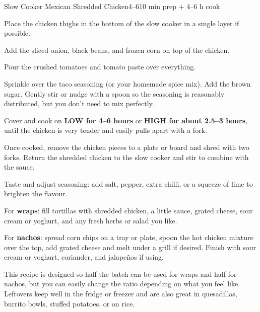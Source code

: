 \begin{recipebox}{Slow Cooker Mexican Shredded Chicken}{4--6}{10 min prep + 4--6 h cook}
  \begin{method}
    \item Place the chicken thighs in the bottom of the slow cooker in a single layer if possible.
    \item Add the sliced onion, black beans, and frozen corn on top of the chicken.
    \item Pour the crushed tomatoes and tomato paste over everything.
    \item Sprinkle over the taco seasoning (or your homemade spice mix). Add the brown sugar. Gently stir or nudge with a spoon so the seasoning is reasonably distributed, but you don’t need to mix perfectly.
    \item Cover and cook on \textbf{LOW for 4--6 hours} or \textbf{HIGH for about 2.5--3 hours}, until the chicken is very tender and easily pulls apart with a fork.
    \item Once cooked, remove the chicken pieces to a plate or board and shred with two forks. Return the shredded chicken to the slow cooker and stir to combine with the sauce.
    \item Taste and adjust seasoning: add salt, pepper, extra chilli, or a squeeze of lime to brighten the flavour.
    \item For \textbf{wraps}: fill tortillas with shredded chicken, a little sauce, grated cheese, sour cream or yoghurt, and any fresh herbs or salad you like.
    \item For \textbf{nachos}: spread corn chips on a tray or plate, spoon the hot chicken mixture over the top, add grated cheese and melt under a grill if desired. Finish with sour cream or yoghurt, coriander, and jalapeños if using.
  \end{method}

  \begin{notes}
    This recipe is designed so half the batch can be used for wraps and half for nachos, but you can easily change the ratio depending on what you feel like. Leftovers keep well in the fridge or freezer and are also great in quesadillas, burrito bowls, stuffed potatoes, or on rice.
  \end{notes}
\end{recipebox}